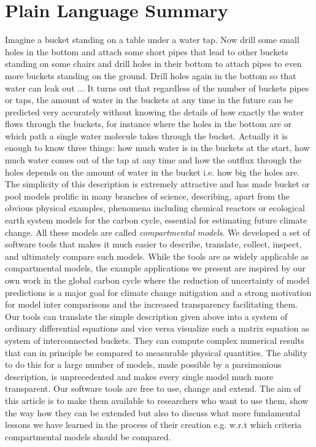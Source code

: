 \section*{Plain Language Summary} 
Imagine a bucket standing on a table under a water tap. Now drill some small
holes in the bottom and attach some short pipes that lead to other buckets
standing on some chairs and drill holes in their bottom to attach pipes to even
more buckets standing on the ground. Drill holes again in the bottom so that
water can leak out ...  It turns out that regardless of the number of buckets
pipes or taps, the amount of water in the buckets at any time in the future can
be predicted very accurately without knowing the details of how exactly the
water flows through the buckets, for instance where the holes in the bottom are
or which path a single water molecule takes through the bucket.  Actually it is
enough to know three things: how much water is in the buckets at the start, how
much water comes out of the tap at any time and how the outflux through the
holes depends on the amount of water in the bucket i.e. how big the holes are.
The simplicity of this description is extremely attractive and has made bucket
or pool models prolific in many branches of science, describing, apart from the
obvious physical examples, phenomena including  chemical reactors or
ecological earth system models for the carbon cycle, essential for estimating
future climate change.  All these models are called \emph{compartmental
models}.  We developed a set of software tools that makes it much easier to
describe, translate, collect, inspect, and ultimately compare such models.
While the tools are as widely applicable as compartmental models, the example
applications we present are inspired by our own work in the global carbon cycle
where the reduction of uncertainty of model predictions is a major goal for
climate change mitigation and a strong motivation for model inter comparisons
and the increased transparency facilitating them.  Our tools can translate the
simple description given above into a system of ordinary differential equations
and vice versa visualize such a matrix  equation as system of interconnected
buckets. They can compute complex numerical results that can in principle
be compared to measurable physical quantities.  The ability to do this for a
large number of models, made possible by a parsimonious description, is
unprecedented and makes every single model much more transparent.  Our software
tools are free to use, change and extend.  The aim of this article is to make
them available to researchers who want to use them, show the way how they can
be extended but also to discuss what more fundamental lessons we have learned
in the process of their creation e.g. w.r.t which criteria compartmental models
should be compared.
%
%

